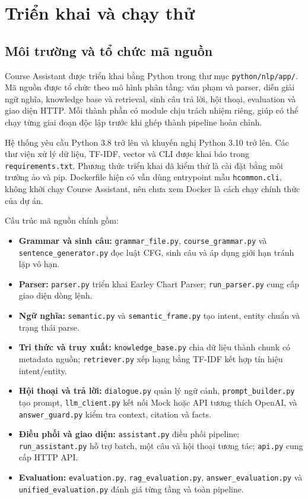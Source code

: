 \chapter{Triển khai và chạy thử}

\section{Môi trường và tổ chức mã nguồn}

Course Assistant được triển khai bằng Python trong thư mục \texttt{python/nlp/app/}. Mã nguồn được tổ chức theo mô hình phân tầng: văn phạm và parser, diễn giải ngữ nghĩa, knowledge base và retrieval, sinh câu trả lời, hội thoại, evaluation và giao diện HTTP. Mỗi thành phần có module chịu trách nhiệm riêng, giúp có thể chạy từng giai đoạn độc lập trước khi ghép thành pipeline hoàn chỉnh.

Hệ thống yêu cầu Python 3.8 trở lên và khuyến nghị Python 3.10 trở lên. Các thư viện xử lý dữ liệu, TF-IDF, vector và CLI được khai báo trong \texttt{requirements.txt}. Phương thức triển khai đã kiểm thử là cài đặt bằng môi trường ảo và pip. Dockerfile hiện có vẫn dùng entrypoint mẫu \texttt{hcommon.cli}, không khởi chạy Course Assistant, nên chưa xem Docker là cách chạy chính thức của dự án.

Cấu trúc mã nguồn chính gồm:
\begin{itemize}
  \item \textbf{Grammar và sinh câu:} \texttt{grammar\_file.py}, \texttt{course\_grammar.py} và \texttt{sentence\_generator.py} đọc luật CFG, sinh câu và áp dụng giới hạn tránh lặp vô hạn.
  \item \textbf{Parser:} \texttt{parser.py} triển khai Earley Chart Parser; \texttt{run\_parser.py} cung cấp giao diện dòng lệnh.
  \item \textbf{Ngữ nghĩa:} \texttt{semantic.py} và \texttt{semantic\_frame.py} tạo intent, entity chuẩn và trạng thái parse.
  \item \textbf{Tri thức và truy xuất:} \texttt{knowledge\_base.py} chia dữ liệu thành chunk có metadata nguồn; \texttt{retriever.py} xếp hạng bằng TF-IDF kết hợp tín hiệu intent/entity.
  \item \textbf{Hội thoại và trả lời:} \texttt{dialogue.py} quản lý ngữ cảnh, \texttt{prompt\_builder.py} tạo prompt, \texttt{llm\_client.py} kết nối Mock hoặc API tương thích OpenAI, và \texttt{answer\_guard.py} kiểm tra context, citation và facts.
  \item \textbf{Điều phối và giao diện:} \texttt{assistant.py} điều phối pipeline; \texttt{run\_assistant.py} hỗ trợ batch, một câu và hội thoại tương tác; \texttt{api.py} cung cấp HTTP API.
  \item \textbf{Evaluation:} \texttt{evaluation.py}, \texttt{rag\_evaluation.py}, \texttt{answer\_evaluation.py} và \texttt{unified\_evaluation.py} đánh giá từng tầng và toàn pipeline.
\end{itemize}


